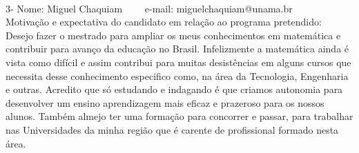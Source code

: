 \documentclass[11pt]{article}
\begin{document}
\\
3- Nome: Miguel Chaquiam
\ \ \ \ e-mail: miguelchaquiam@unama.br
\\[0.2cm]
Motivação e expectativa do candidato em relação ao programa pretendido:
\\Desejo fazer o mestrado para ampliar os meus conhecimentos em matemática e contribuir para avanço da educação no Brasil. Infelizmente a matemática ainda é vista como difícil e assim contribui para muitas desistências em alguns cursos que necessita desse conhecimento especifico como, na área da Tecnologia, Engenharia e outras. Acredito que só estudando e indagando é que criamos autonomia para desenvolver um ensino aprendizagem mais eficaz e prazeroso para os nossos alunos. Também almejo ter uma formação para concorrer e passar, para trabalhar nas Universidades da minha região que é carente de profissional formado nesta área.
\end{document}
